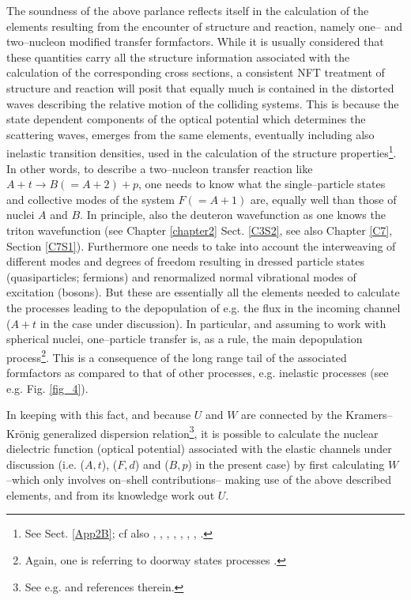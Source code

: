 The soundness of the above parlance  reflects itself in the calculation of the elements resulting from the encounter of structure and reaction, namely one-- and two--nucleon modified transfer formfactors. While it is usually considered that these quantities carry all the structure information associated with the calculation of the corresponding cross sections, a consistent NFT treatment of structure and reaction will posit that equally much is contained in the distorted waves describing the relative motion of the colliding systems. This is because the state dependent components of the optical potential  which determines the scattering waves, emerges from the same elements, eventually including also inelastic transition densities, used in the calculation of the structure properties\footnote{See Sect. \ref{App2B}; cf also \cite{Broglia:81b}, \cite{Pollarolo:83}, \cite{Broglia:04a}, \cite{Fernandez:10}, \cite{Fernandez:10b}, \cite{Dickhoff:05}, \cite{Jenning:11}, \cite{Montanari:14} \cite{Barbieri:05,Dickhoff:17,Rotureau:17}.}. In other words, to describe a two--nucleon transfer reaction like $A+t\rightarrow B(=A+2)+p$, one needs to know what the single--particle states and collective modes of the system $F(=A+1)$ are, equally well than those of nuclei $A$ and $B$. In principle, also  the deuteron wavefunction as one knows the triton wavefunction (see Chapter \ref{chapter2} Sect. \ref{C3S2}, see also Chapter \ref{C7}, Section \ref{C7S1}). Furthermore one needs to take into account the interweaving of different modes and degrees of freedom resulting in   dressed particle states (quasiparticles; fermions) and renormalized normal vibrational modes of excitation (bosons). But these are essentially all the elements needed to calculate the processes leading to the depopulation of e.g. the flux in the incoming channel ($A+t$ in the case under discussion). In particular, and assuming to work with spherical nuclei, one--particle transfer is, as a rule, the main depopulation process\footnote{Again, one is referring to doorway states processes \cite{Feshbach:58}.}. This is a consequence of the long range tail of the associated formfactors as compared to that of other processes, e.g. inelastic processes (see e.g. Fig. \ref{fig_4}).


In keeping with this fact, and because $U$ and $W$ are connected by the Kramers--Kr\"onig generalized dispersion relation\footnote{See e.g. \cite{Mahaux:85} and references therein.}, it is possible to calculate the nuclear dielectric function (optical potential) associated with the elastic channels under discussion (i.e. ($A,t$), ($F,d$) and ($B,p$) in the present case) by first calculating  $W$ --which only involves on--shell contributions-- making use of the above described elements, and from its knowledge work out $U$.

